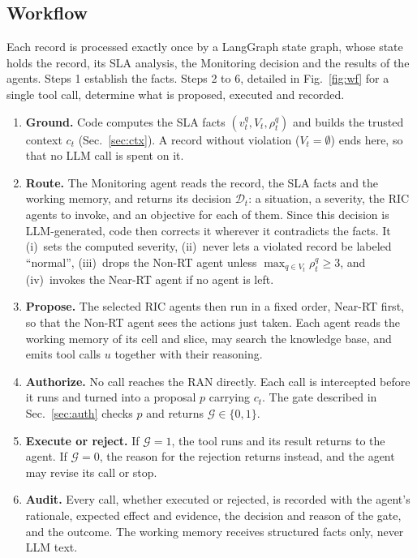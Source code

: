 \documentclass[conference]{IEEEtran}
\newcommand{\G}{\mathcal{G}}
\begin{document}
\subsection{Workflow}
\label{sec:wf}
Each record is processed exactly once by a LangGraph state graph, whose state holds the record, its SLA analysis, the Monitoring decision and the results of the agents. Steps 1 establish the facts. Steps 2 to 6, detailed in Fig.~\ref{fig:wf} for a single tool call, determine what is proposed, executed and recorded.
\begin{enumerate}
\item \textbf{Ground.} Code computes the SLA facts $(v_t^q,V_t,\rho_t^q)$ and builds the trusted context $c_t$ (Sec.~\ref{sec:ctx}). A record without violation ($V_t=\emptyset$) ends here, so that no LLM call is spent on it.
\item \textbf{Route.} The Monitoring agent reads the record, the SLA facts and the working memory, and returns its decision $\mathcal{D}_t$: a situation, a severity, the RIC agents to invoke, and an objective for each of them. Since this decision is LLM-generated, code then corrects it wherever it contradicts the facts. It (i)~sets the computed severity, (ii)~never lets a violated record be labeled ``normal'', (iii)~drops the Non-RT agent unless $\max_{q\in V_t}\rho_t^q\ge3$, and (iv)~invokes the Near-RT agent if no agent is left.
\item \textbf{Propose.} The selected RIC agents then run in a fixed order, Near-RT first, so that the Non-RT agent sees the actions just taken. Each agent reads the working memory of its cell and slice, may search the knowledge base, and emits tool calls $u$ together with their reasoning.
\item \textbf{Authorize.} No call reaches the RAN directly. Each call is intercepted before it runs and turned into a proposal $p$ carrying $c_t$. The gate described in Sec.~\ref{sec:auth} checks $p$ and returns $\G\in\{0,1\}$.
\item \textbf{Execute or reject.} If $\G{=}1$, the tool runs and its result returns to the agent. If $\G{=}0$, the reason for the rejection returns instead, and the agent may revise its call or stop.
\item \textbf{Audit.} Every call, whether executed or rejected, is recorded with the agent's rationale, expected effect and evidence, the decision and reason of the gate, and the outcome. The working memory receives structured facts only, never LLM text.
\end{enumerate}
\end{document}
